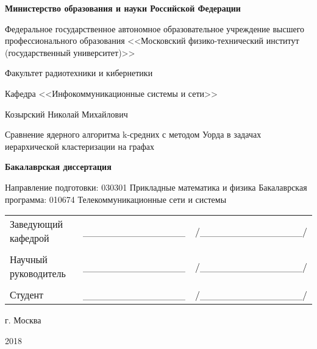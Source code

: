 \begin{titlepage}
\thispagestyle{empty}

{\centering\bfseries\upshape
Министерство образования и науки Российской Федерации
\par}

{\centering
Федеральное государственное автономное образовательное учреждение высшего профессионального образования 
<<Московский физико{}-технический институт (государственный университет)>>\par}

{\centering
Факультет радиотехники и кибернетики \par}

{\centering 
Кафедра <<Инфокоммуникационные системы и сети>>
\par}


\bigskip

\bigskip

\vfill

{\centering\large
Козырский Николай Михайлович
\par}
   
{\centering\Huge

Сравнение ядерного алгоритма k-средних с методом Уорда в задачах иерархической кластеризации на графах

\par}

\bigskip

{\centering\bfseries
Бакалаврская диссертация

Направление подготовки: 030301 Прикладные математика и физика
Бакалаврская программа: 010674 Телекоммуникационные сети и системы 

\par}

\vfill

\begin{tabular}{lll}\\
Заведующий кафедрой  & ______________ & /______________/ \\
                     &                &                  \\
Научный руководитель & ______________ & /______________/ \\
                     &                &                  \\
Студент              & ______________ & /______________/ \\
\end{tabular}

\vfill

{\centering
г. Москва 

2018
\par}

\end{titlepage}

